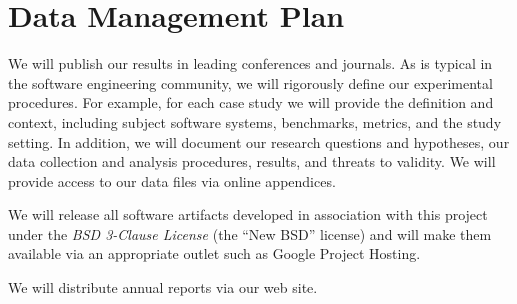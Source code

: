 
\section*{Data Management Plan}

We will publish our results in leading conferences and journals.
As is typical in the software engineering community, we will rigorously define our experimental procedures.
For example, for each case study we will provide the definition and context, including subject software systems, benchmarks, metrics, and the study setting.
In addition, we will document our research questions and hypotheses, our data collection and analysis procedures, results, and threats to validity.
We will provide access to our data files via online appendices.

We will release all software artifacts developed in association with this project under the \textit{BSD 3-Clause License} (the ``New BSD'' license) and will make them available via an appropriate outlet such as Google Project Hosting.

We will distribute annual reports via our web site.
